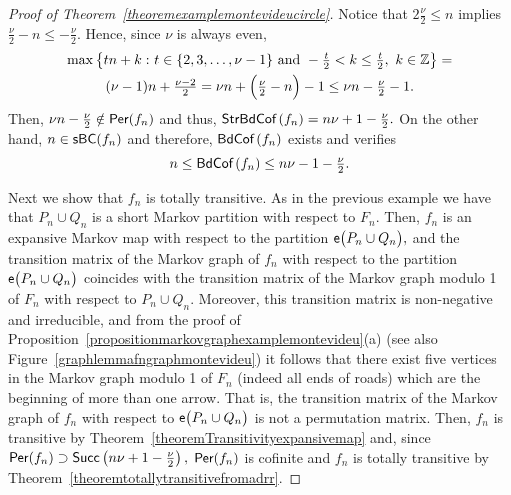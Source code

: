 \documentclass[a4paper, 11pt]{amsart}
\numberwithin{equation}{section}
\theoremstyle{customnumberedtheorem}
\theoremstyle{definitionwithbfnote}
\newcommand{\Z}{\ensuremath{\mathbb{Z}}}
\DeclareMathOperator{\bc}{\textsf{\upshape BdCof\,}}
\DeclareMathOperator{\sbc}{\textsf{\upshape StrBdCof\,}}
\DeclareMathOperator{\Per}{\textsf{\upshape Per}}
\DeclareMathOperator{\Succ}{\textsf{\upshape Succ}}
\DeclareMathOperator{\sbcset}{\textsf{\upshape sBC}}
\DeclareMathOperator{\eexp}{\textsf{\upshape e}}
\newcommand{\succs}[1]{\ensuremath{\Succ\left(#1\right)}}
\newcommand{\set}[2]{\ensuremath{\left\{#1 \,\colon #2\right\}}}
\newcommand{\bigemap}[1]{\ensuremath{\eexp\bigl(#1\bigr)}}
\begin{document}
\begin{proof}[Proof of Theorem~\ref{theoremexamplemontevideucircle}]
Notice that $2 \tfrac{\nu}{2} \le n$ implies
$\tfrac{\nu}{2} - n \le -\tfrac{\nu}{2}.$
Hence, since $\nu$ is always even,
\begin{multline*}
   \max \set{t n + k}{t \in \{2,3,\dots,\nu-1\} \text{ and } -\tfrac{t}{2} < k \le \tfrac{t}{2},\ k \in \Z} = \\
   (\nu-1)n + \tfrac{\nu-2}{2} = \nu n + \Bigl( \tfrac{\nu}{2} - n\Bigr) - 1 \le \nu n - \tfrac{\nu}{2} -1.
\end{multline*}
Then,
$\nu n - \tfrac{\nu}{2} \notin \Per(f_{n})$ and thus,
$\sbc(f_n) = n\nu+1-\tfrac{\nu}{2}.$
On the other hand, $n \in \sbcset(f_n)$ and therefore,
$\bc(f_n)$ exists and verifies
\[ n\le \bc(f_n) \le n\nu - 1 -\tfrac{\nu}{2}. \]

Next we show that $f_n$ is totally transitive.
As in the previous example we have that
$P_n \cup Q_n$ is a short Markov partition with respect to $F_n.$
Then, $f_n$ is an expansive Markov map with respect to the
partition $\bigemap{P_n \cup Q_n},$
and the transition matrix of the Markov graph of $f_n$
with respect to the partition $\bigemap{P_n \cup Q_n}$
coincides with the transition matrix of the Markov graph modulo 1
of $F_n$ with respect to $P_n \cup Q_n.$ Moreover,
this transition matrix is non-negative and irreducible,
and from the proof of
Proposition~\ref{propositionmarkovgraphexamplemontevideu}(a)
(see also Figure~\ref{graphlemmafngraphmontevideu})
it follows that there exist five vertices in the
Markov graph modulo 1 of $F_n$ (indeed all ends of roads)
which are the beginning of more than one arrow.
That is, the transition matrix of the Markov graph of $f_n$
with respect to $\bigemap{P_n \cup Q_n}$ is not
a permutation matrix.
Then, $f_n$ is transitive by Theorem~\ref{theoremTransitivityexpansivemap}
and, since $\Per(f_n) \supset \succs{n\nu+1-\tfrac{\nu}{2}},$
$\Per(f_n)$ is cofinite and $f_n$ is totally transitive
by Theorem~\ref{theoremtotallytransitivefromadrr}.


\end{proof}
\end{document}
